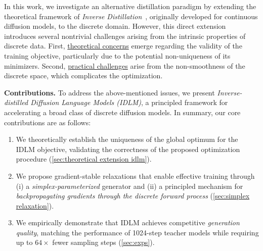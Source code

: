  In this work, we investigate an alternative distillation paradigm by extending the theoretical framework of \emph{Inverse Distillation}~\citep{gushchin2025inverse, kornilov2025universal}, originally developed for continuous diffusion models, to the discrete domain. However, this direct extension introduces several nontrivial challenges arising from the intrinsic properties of discrete data. First, \underline{theoretical concerns} emerge regarding the validity of the training objective, particularly due to the potential non-uniqueness of its minimizers. Second, \underline{practical challenges} arise from the non-smoothness of the discrete space, which complicates the optimization. 
  
  \textbf{Contributions.} To address the above-mentioned issues, we present \emph{Inverse-distilled Diffusion Language Models (IDLM)}, a principled framework for accelerating a broad class of discrete diffusion models. In summary, our core contributions are as follows:

  \vspace{-0.8em}

  \begin{enumerate}
    \setlength{\itemsep}{1pt}
    \setlength{\parskip}{1pt}
    \item We theoretically establish the uniqueness of the global optimum for the IDLM objective, validating the correctness of the proposed optimization procedure (\wasyparagraph\ref{sec:theoretical extension idlm}).

    \item We propose gradient-stable relaxations that enable effective training through (i) a \emph{simplex-parameterized} generator and (ii) a principled mechanism for \emph{backpropagating gradients through the discrete forward process} (\wasyparagraph\ref{sec:simplex relaxation}).
    \item We empirically demonstrate that IDLM achieves competitive \emph{generation quality}, matching the performance of 1024-step teacher models while requiring up to $64\times$ fewer sampling steps (\wasyparagraph\ref{sec:exps}).
  \end{enumerate}
